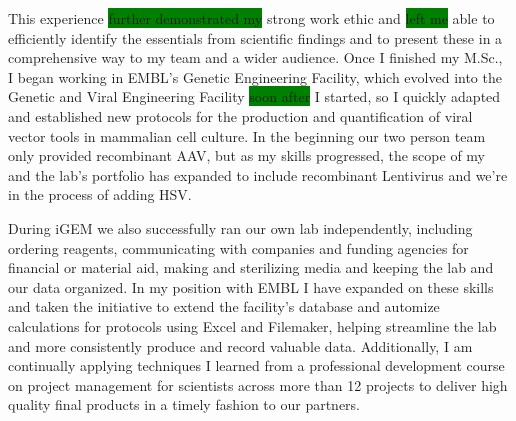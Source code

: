 \documentclass[11pt,a4paper,sans]{moderncv}
\begin{document}
\begin{spacing}{1.15}
This experience \colorbox{green}{further demonstrated my} strong work ethic and \colorbox{green}{left me} able to efficiently identify the essentials from scientific findings and to present these in a comprehensive way to my team and a wider audience.
Once I finished my M.Sc., I began working in EMBL's Genetic Engineering Facility, which evolved into the Genetic and Viral Engineering Facility \colorbox{green}{soon after} I started, so I quickly adapted and established new protocols for the production and quantification of viral vector tools in mammalian cell culture. 			
In the beginning our two person team only provided recombinant AAV, but as my skills progressed, the scope of my and the lab's portfolio has expanded to include recombinant Lentivirus and we're in the process of adding HSV.\par

During iGEM we also successfully ran our own lab independently, including ordering reagents, communicating with companies and funding agencies for financial or material aid, making and sterilizing media and keeping the lab and our data organized. 
In my position with EMBL I have expanded on these skills and taken the initiative to extend the facility's database and automize calculations for protocols using Excel and Filemaker, helping streamline the lab and more consistently produce and record valuable data.
Additionally, I am continually applying techniques I learned from a professional development course on project management for scientists across more than 12 projects to deliver high quality final products in a timely fashion to our partners.
\par


\end{spacing}
\end{document}
